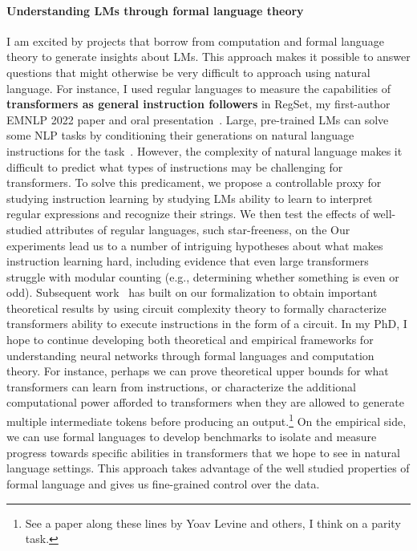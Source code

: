 \documentclass[11pt]{article}
\begin{document}
\paragraph{Understanding LMs through formal language theory}

I am excited by projects 
that borrow from computation and formal language theory
to generate insights about LMs.
This approach makes it possible to answer 
questions that might otherwise be very difficult to approach using natural language.
For instance, I used regular languages
to measure the capabilities of 
\textbf{transformers as general instruction followers}
in RegSet, my first-author EMNLP 2022 paper 
and oral presentation~\cite{Finlayson2022WhatMI}. 
Large, pre-trained LMs can solve some NLP tasks 
by conditioning their generations on natural language instructions 
for the task~\cite{mishra2021crosstask, Wei2021FinetunedLM}. 
However, the complexity of natural language makes it difficult to
predict what types of instructions may be challenging for transformers.
To solve this predicament, 
we propose a controllable proxy for studying instruction learning
by studying LMs ability to learn to interpret regular expressions
and recognize their strings.
We then test the effects of well-studied attributes of regular languages,
such star-freeness, on the 
Our experiments lead us to a number of intriguing hypotheses 
about what makes instruction learning hard, 
including evidence that even large transformers struggle with modular counting 
(e.g., determining whether something is even or odd). 
Subsequent work~\cite{Merrill2022LogPrecisionTA} 
has built on our formalization 
to obtain important theoretical results
by using circuit complexity theory
to formally characterize transformers ability to execute instructions in the form of a circuit.
In my PhD, I hope to continue developing both theoretical and empirical frameworks 
for understanding neural networks through formal languages and computation theory.
For instance, perhaps we can prove theoretical upper bounds 
for what transformers can learn from instructions,
or characterize the additional computational power 
afforded to transformers 
when they are allowed to generate multiple intermediate tokens 
before producing an output.\footnote{
  See a paper along these lines by Yoav Levine and others, I think on a parity task.
}
On the empirical side, we can use formal languages to develop benchmarks 
to isolate and measure progress towards specific abilities 
in transformers that we hope to see in natural language settings.
This approach takes advantage of the well studied properties of formal language
and gives us fine-grained control over the data.
\end{document}
